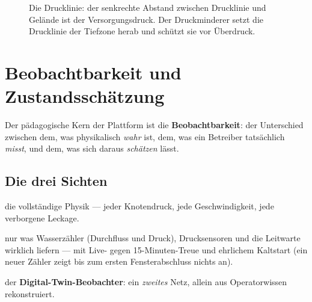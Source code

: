 \documentclass[11pt,a4paper,parskip=half]{scrreprt}
\begin{document}
\begin{figure}[t]
\centering
{}
\caption{Die Drucklinie: der senkrechte Abstand zwischen Drucklinie und Gelände
ist der Versorgungsdruck. Der Druckminderer setzt die Drucklinie der Tiefzone
herab und schützt sie vor Überdruck.}
\label{fig:drucklinie}
\end{figure}

\chapter{Beobachtbarkeit und Zustandsschätzung}
\label{ch:beobachtbarkeit}

Der pädagogische Kern der Plattform ist die \textbf{Beobachtbarkeit}: der
Unterschied zwischen dem, was physikalisch \emph{wahr} ist, dem, was ein Betreiber
tatsächlich \emph{misst}, und dem, was sich daraus \emph{schätzen} lässt.

\section{Die drei Sichten}

\begin{description}[leftmargin=1.2em]
\item[Realität] die vollständige Physik — jeder Knotendruck, jede Geschwindigkeit,
  jede verborgene Leckage.
\item[Gemessen] nur was Wasserzähler (Durchfluss und Druck), Drucksensoren und die
  Leitwarte wirklich liefern — mit Live- gegen 15-Minuten-Treue und ehrlichem
  Kaltstart (ein neuer Zähler zeigt bis zum ersten Fensterabschluss nichts an).
\item[Schätzung] der \textbf{Digital-Twin-Beobachter}: ein \emph{zweites} Netz,
  allein aus Operatorwissen rekonstruiert.
\end{description}
\end{document}
